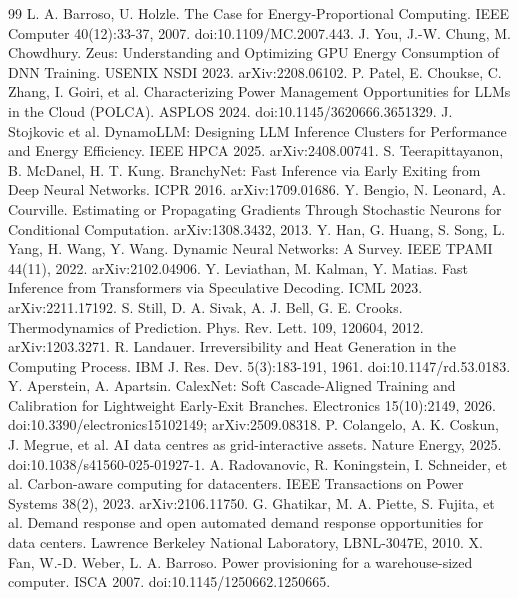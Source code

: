 \documentclass[3p,twocolumn]{elsarticle}
\begin{document}
\begin{thebibliography}{99}
\setlength{\itemsep}{2pt plus 0.5pt}\setlength{\parsep}{0pt}
\label{r1} L. A. Barroso, U. Holzle. The Case for Energy-Proportional Computing. IEEE Computer 40(12):33-37, 2007. doi:10.1109/MC.2007.443.
\label{r2} J. You, J.-W. Chung, M. Chowdhury. Zeus: Understanding and Optimizing GPU Energy Consumption of DNN
Training. USENIX NSDI 2023. arXiv:2208.06102.
\label{r3} P. Patel, E. Choukse, C. Zhang, I. Goiri, et al. Characterizing Power Management Opportunities for LLMs in the Cloud (POLCA). ASPLOS 2024. doi:10.1145/3620666.3651329.
\label{r4} J. Stojkovic et al. DynamoLLM: Designing LLM Inference Clusters for Performance and Energy Efficiency.
IEEE HPCA 2025. arXiv:2408.00741.
\label{r5} S. Teerapittayanon, B. McDanel, H. T. Kung. BranchyNet: Fast Inference via Early Exiting from Deep Neural
Networks. ICPR 2016. arXiv:1709.01686.
\label{r6} Y. Bengio, N. Leonard, A. Courville. Estimating or Propagating Gradients Through Stochastic Neurons for
Conditional Computation. arXiv:1308.3432, 2013.
\label{r7} Y. Han, G. Huang, S. Song, L. Yang, H. Wang, Y. Wang. Dynamic Neural Networks: A Survey. IEEE TPAMI
44(11), 2022. arXiv:2102.04906.
\label{r8} Y. Leviathan, M. Kalman, Y. Matias. Fast Inference from Transformers via Speculative Decoding. ICML 2023.
arXiv:2211.17192.
\label{r9} S. Still, D. A. Sivak, A. J. Bell, G. E. Crooks. Thermodynamics of Prediction. Phys. Rev. Lett. 109,
120604, 2012. arXiv:1203.3271.
\label{r10} R. Landauer. Irreversibility and Heat Generation in the Computing Process. IBM J. Res. Dev. 5(3):183-191, 1961. doi:10.1147/rd.53.0183.
\label{r11} Y. Aperstein, A. Apartsin. CalexNet: Soft Cascade-Aligned Training and Calibration for Lightweight
Early-Exit Branches. Electronics 15(10):2149, 2026. doi:10.3390/electronics15102149; arXiv:2509.08318.
\label{r12} P. Colangelo, A. K. Coskun, J. Megrue, et al. AI data centres as grid-interactive assets. Nature Energy, 2025. doi:10.1038/s41560-025-01927-1.
\label{r13} A. Radovanovic, R. Koningstein, I. Schneider, et al. Carbon-aware computing for datacenters. IEEE Transactions on Power Systems 38(2), 2023. arXiv:2106.11750.
\label{r14} G. Ghatikar, M. A. Piette, S. Fujita, et al. Demand response and open automated demand response opportunities for data centers. Lawrence Berkeley National Laboratory, LBNL-3047E, 2010.
\label{r15} X. Fan, W.-D. Weber, L. A. Barroso. Power provisioning for a warehouse-sized computer. ISCA 2007. doi:10.1145/1250662.1250665.

\end{thebibliography}
\end{document}
